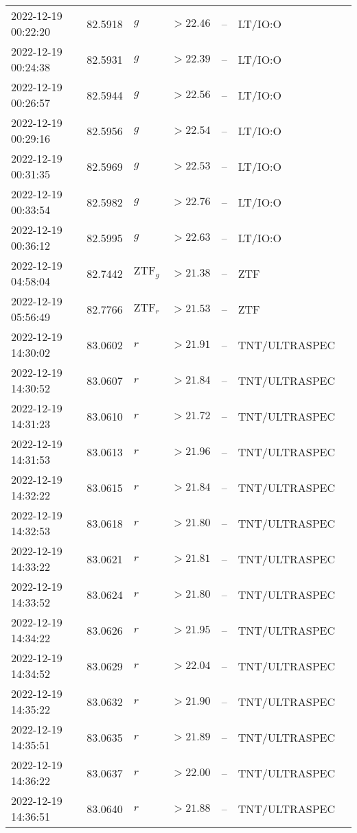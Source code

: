 \documentclass{nature_plusfigure}
\begin{document}
\begin{supplement}
\begin{center}
\begin{longtable}{lllllll}
2022-12-19 00:22:20 & 82.5918 & $g$ & $>22.46$ & -- & LT/IO:O &  \\ 
2022-12-19 00:24:38 & 82.5931 & $g$ & $>22.39$ & -- & LT/IO:O &  \\ 
2022-12-19 00:26:57 & 82.5944 & $g$ & $>22.56$ & -- & LT/IO:O &  \\ 
2022-12-19 00:29:16 & 82.5956 & $g$ & $>22.54$ & -- & LT/IO:O &  \\ 
2022-12-19 00:31:35 & 82.5969 & $g$ & $>22.53$ & -- & LT/IO:O &  \\ 
2022-12-19 00:33:54 & 82.5982 & $g$ & $>22.76$ & -- & LT/IO:O &  \\ 
2022-12-19 00:36:12 & 82.5995 & $g$ & $>22.63$ & -- & LT/IO:O &  \\ 
2022-12-19 04:58:04 & 82.7442 & $\mathrm{ZTF}_{g}$ & $>21.38$ & -- & ZTF &  \\ 
2022-12-19 05:56:49 & 82.7766 & $\mathrm{ZTF}_{r}$ & $>21.53$ & -- & ZTF &  \\ 
2022-12-19 14:30:02 & 83.0602 & $r$ & $>21.91$ & -- & TNT/ULTRASPEC &  \\ 
2022-12-19 14:30:52 & 83.0607 & $r$ & $>21.84$ & -- & TNT/ULTRASPEC &  \\ 
2022-12-19 14:31:23 & 83.0610 & $r$ & $>21.72$ & -- & TNT/ULTRASPEC &  \\ 
2022-12-19 14:31:53 & 83.0613 & $r$ & $>21.96$ & -- & TNT/ULTRASPEC &  \\ 
2022-12-19 14:32:22 & 83.0615 & $r$ & $>21.84$ & -- & TNT/ULTRASPEC &  \\ 
2022-12-19 14:32:53 & 83.0618 & $r$ & $>21.80$ & -- & TNT/ULTRASPEC &  \\ 
2022-12-19 14:33:22 & 83.0621 & $r$ & $>21.81$ & -- & TNT/ULTRASPEC &  \\ 
2022-12-19 14:33:52 & 83.0624 & $r$ & $>21.80$ & -- & TNT/ULTRASPEC &  \\ 
2022-12-19 14:34:22 & 83.0626 & $r$ & $>21.95$ & -- & TNT/ULTRASPEC &  \\ 
2022-12-19 14:34:52 & 83.0629 & $r$ & $>22.04$ & -- & TNT/ULTRASPEC &  \\ 
2022-12-19 14:35:22 & 83.0632 & $r$ & $>21.90$ & -- & TNT/ULTRASPEC &  \\ 
2022-12-19 14:35:51 & 83.0635 & $r$ & $>21.89$ & -- & TNT/ULTRASPEC &  \\ 
2022-12-19 14:36:22 & 83.0637 & $r$ & $>22.00$ & -- & TNT/ULTRASPEC &  \\ 
2022-12-19 14:36:51 & 83.0640 & $r$ & $>21.88$ & -- & TNT/ULTRASPEC &  \\ 

\end{longtable}
\end{center}
\end{supplement}
\end{document}
